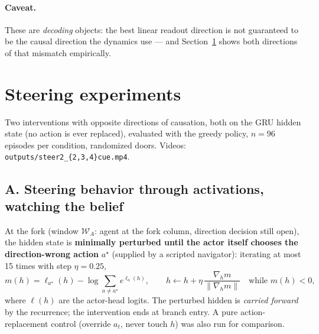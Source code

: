 \documentclass[11pt]{article}
\begin{document}
\paragraph{Caveat.} These are \emph{decoding} objects: the best linear readout direction is not
guaranteed to be the causal direction the dynamics use --- and Section~\ref{sec:steer} shows both
directions of that mismatch empirically.

\section{Steering experiments}
\label{sec:steer}

Two interventions with opposite directions of causation, both on the GRU hidden state (no action
is ever replaced), evaluated with the greedy policy, $n{=}96$ episodes per condition, randomized
doors. Videos: \texttt{outputs/steer2\_\{2,3,4\}cue.mp4}.

\subsection{A. Steering behavior through activations, watching the belief}

At the fork (window $\mathcal{W}_A$: agent at the fork column, direction decision still open),
the hidden state is \textbf{minimally perturbed until the actor itself chooses the
direction-wrong action} $a^\star$ (supplied by a scripted navigator): iterating at most 15 times
with step $\eta = 0.25$,
\[
m(h) = \ell_{a^\star}(h) - \log\!\!\sum_{a \neq a^\star}\!\! e^{\ell_a(h)}, \qquad
h \leftarrow h + \eta\, \frac{\nabla_h m}{\lVert \nabla_h m \rVert} \quad \text{while } m(h) < 0,
\]
where $\ell(h)$ are the actor-head logits. The perturbed hidden is \emph{carried forward} by the
recurrence; the intervention ends at branch entry. A pure action-replacement control (override
$a_t$, never touch $h$) was also run for comparison.
\end{document}
